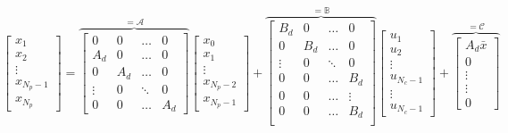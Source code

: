 \documentclass[a4paper,12pt,fleqn]{article}
\newcommand{\Np}{{N_p}}
\newcommand{\Nc}{{N_c}}
\begin{document}
\begin{equation}
\begin{bmatrix}
x_1\\
x_2\\
\vdots\\
x_{\Np-1}\\
x_{\Np}
\end{bmatrix}=
\overbrace{
\begin{bmatrix}
 0      &0      &\dots  &0\\
 A_d    &0      &\dots  & 0\\
 0      &A_d    &\dots  &0\\
 \vdots &0      &\ddots & 0\\
 0      &0      &\dots  &A_d
\end{bmatrix}
}^{=\mathcal{A}}
\begin{bmatrix}
x_0\\
x_1\\
\vdots\\
x_{\Np-2}\\
x_{\Np-1} 
\end{bmatrix} +
\overbrace{
\begin{bmatrix}
 B_d    &0      &\dots  & 0\\
 0      &B_d    &\dots  &0\\
 \vdots &0      &\ddots & 0\\
 0      &0      &\dots  &B_d\\
 0      &0      &\dots  &\vdots\\
 0      &0      &\dots  &B_d\\
\end{bmatrix}
}^{=\mathbb B}
\begin{bmatrix}
u_1\\
u_2\\
\vdots\\
u_{\Nc-1}\\
\vdots\\
u_{\Nc-1}
\end{bmatrix} +
\overbrace{
\begin{bmatrix}
A_d\bar x\\
0\\
\vdots\\
\vdots \\
0 
\end{bmatrix}
}^{=\mathcal{C}}
\end{equation}
\end{document}
